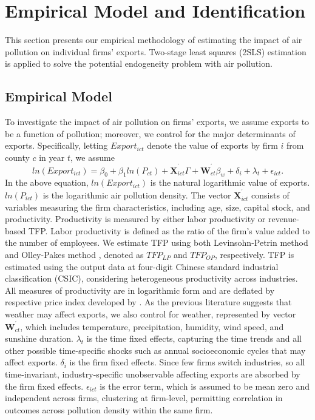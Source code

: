 \documentclass[12pt]{article}
\begin{document}
\section{Empirical Model and Identification}

\label{sec:empirical_strategy} This section presents our empirical
methodology of estimating the impact of air pollution on individual firms'
exports. Two-stage
least squares (2SLS)
estimation is applied to solve the potential endogeneity problem with
air pollution.

\subsection{Empirical Model}

To investigate the impact of air pollution on firms' exports, we assume
exports to be a function of pollution; moreover, we control for the major
determinants of exports. Specifically, letting $Export_{ict}$
denote the value of exports by firm $i$ from county $c$ in year $t$, we
assume 
\begin{equation}
ln(Export_{ict})=\beta _{0}+\beta _{1}ln(P_{ct})+\mathbf{X}%
_{ict}^{^{\prime }}\Gamma +\mathbf{W}_{ct}^{^{\prime }}\beta _{w}+\delta
_{i}+\lambda _{t}+\epsilon _{ict}.  \label{equ1}
\end{equation}%
In the above equation, $ln(Export_{ict})$ is the natural
logarithmic value of exports. $ln(P_{ict})$ is the logarithmic air
pollution density. The vector $\mathbf{X}_{ict}^{^{\prime }}$ consists of
variables measuring the firm characteristics, including age, size,
capital stock, and productivity. Productivity is measured by either labor
productivity or revenue-based TFP. Labor productivity is defined as the
ratio of the firm's value added to the number of employees. We estimate TFP
using both Levinsohn-Petrin method \citep{levinsohn2003estimating} and
Olley-Pakes method \citep{olley1996dynamics}, denoted as $TFP_{LP}$ and $%
TFP_{OP}$, respectively. TFP is estimated using the output data at four-digit
Chinese standard industrial classification (CSIC), considering heterogeneous
productivity across industries. All measures of productivity are in
logarithmic form and are deflated by respective price index developed by %
\citep{brandt2017wto}. As the previous literature %
\citep[e.g.,][]{jones2010climate} suggests that weather may affect exports,
we also control for weather, represented by vector $\mathbf{W}%
_{ct}^{^{\prime}}$, which includes temperature, precipitation, humidity,
wind speed, and sunshine duration. $\lambda _{t}$ is the time fixed effects,
capturing the time trends and all other possible time-specific shocks such
as annual socioeconomic cycles that may affect exports. $\delta _{i}$ is the
firm fixed effects. Since few
firms switch industries, so all time-invariant, industry-specific
unobservable affecting exports are absorbed by the firm fixed effects.
$\epsilon _{ict}$ is
the error term, which is assumed to be mean zero and independent across
firms, clustering at firm-level, permitting correlation in outcomes across pollution density
within the same firm.
\end{document}
